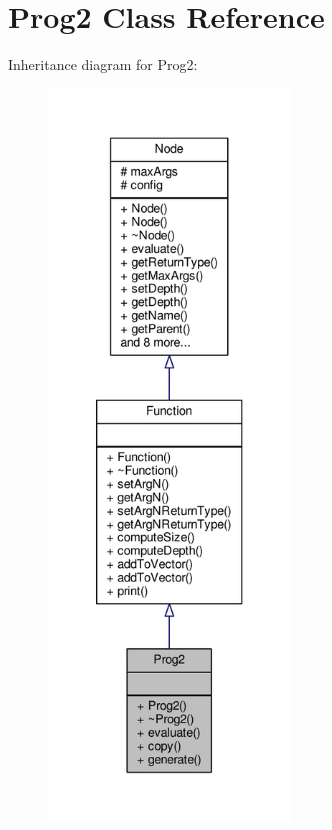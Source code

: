 \hypertarget{classProg2}{}\section{Prog2 Class Reference}
\label{classProg2}


Inheritance diagram for Prog2\+:
\nopagebreak
\begin{figure}[H]
\begin{center}
\leavevmode
\includegraphics[height=550pt]{classProg2__inherit__graph}
\end{center}
\end{figure}


